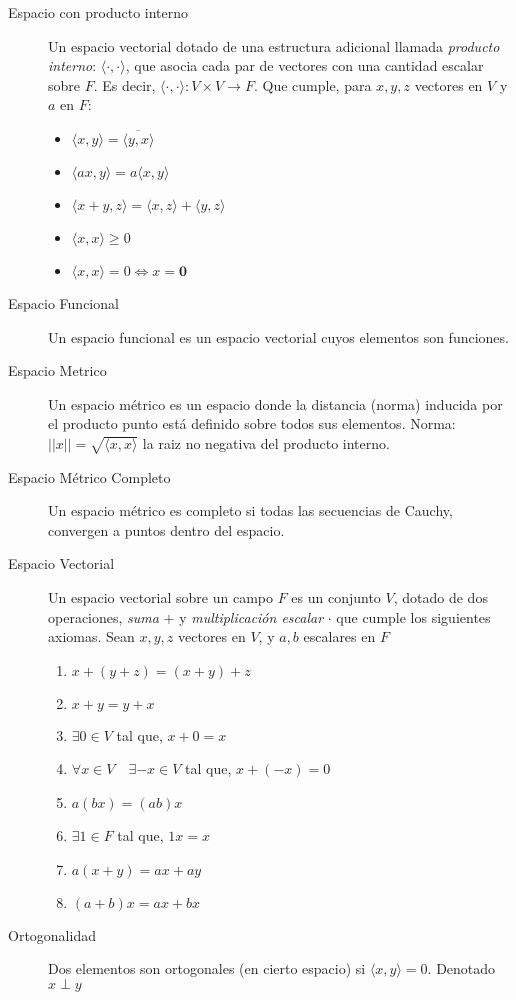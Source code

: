 \documentclass[../../Main/Main.tex]{subfiles}
\begin{document}
\begin{description}

	\item[Espacio con producto interno] Un espacio vectorial dotado de una estructura adicional llamada \textit{producto interno}: $\langle \cdot, \cdot \rangle$, que asocia cada par de vectores con una cantidad escalar sobre $F$. Es decir, $\langle \cdot, \cdot \rangle : V \times V \to F$. Que cumple, para $x,y,z$ vectores en $V$ y $a$ en $F$:	
	\begin{itemize}
		\item $\langle x,y\rangle =\overline{\langle y,x\rangle}$
		\item $\langle ax,y\rangle = a \langle x,y\rangle$
		\item $\langle x+y,z\rangle = \langle x,z\rangle + \langle y,z\rangle$
		\item $\langle x,x\rangle \geq 0 $ 
		\item $\langle x,x\rangle = 0 \Leftrightarrow x = \mathbf{0}$
	\end{itemize}

	\item[Espacio Funcional] Un espacio funcional es un espacio vectorial cuyos elementos son funciones.

	\item[Espacio Metrico] Un espacio métrico es un espacio donde la distancia (norma) inducida por el producto punto está definido sobre todos sus elementos. Norma: $||x|| = \sqrt{\langle x,x\rangle}$ la raiz no negativa del producto interno.
	
	\item[Espacio Métrico Completo] Un espacio métrico es completo si todas las secuencias de Cauchy, convergen a puntos dentro del espacio.  
	
	\item[Espacio Vectorial] Un espacio vectorial sobre un campo $F$ es un conjunto $V$, dotado de dos operaciones, \textit{suma} $+$ y \textit{multiplicación escalar} $\cdot$ que cumple los siguientes axiomas. Sean $x,y,z$ vectores en $V$, y $a,b$ escalares en $F$
	\begin{enumerate}
		\item $x+(y+z) = (x + y) + z$
		\item $x + y = y + x$
		\item $\exists 0 \in V$ tal que, $x + 0 = x$
		\item $\forall x \in V\quad \exists -x \in V$ tal que, $x + (-x) = 0$
		\item $a(bx) = (ab)x$ 
		\item $\exists 1 \in F$ tal que, $1x = x$
		\item $a(x+y) = ax + ay$
		\item $(a+b)x = ax + bx$
	\end{enumerate}	
	
	\item[Ortogonalidad] Dos elementos son ortogonales (en cierto espacio) si $\langle x,y\rangle = 0$. Denotado $x\perp y$

\end{description}
\end{document}
